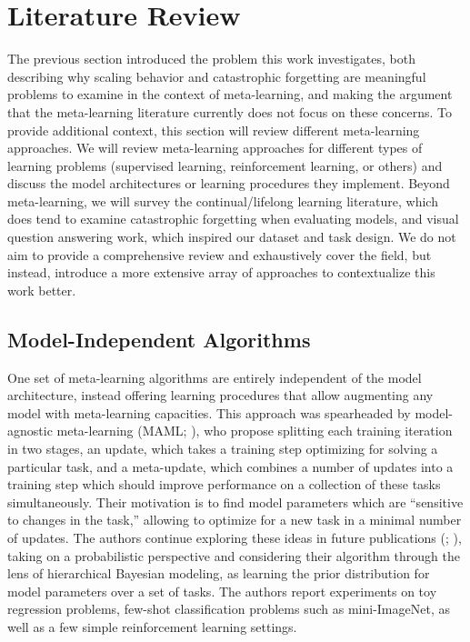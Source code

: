 \chapter{Literature Review\label{ch:literature-review}}
The previous section introduced the problem this work investigates, both describing why scaling behavior and catastrophic forgetting are meaningful problems to examine in the context of meta-learning, and making the argument that the meta-learning literature currently does not focus on these concerns. To provide additional context, this section will review different meta-learning approaches. We will review meta-learning approaches for different types of learning problems (supervised learning, reinforcement learning, or others) and discuss the model architectures or learning procedures they implement. Beyond meta-learning, we will survey the continual/lifelong learning literature, which does tend to examine catastrophic forgetting when evaluating models, and visual question answering work, which inspired our dataset and task design. We do not aim to provide a comprehensive review and exhaustively cover the field, but instead, introduce a more extensive array of approaches to contextualize this work better.

\section{Model-Independent Algorithms}
One set of meta-learning algorithms are entirely independent of the model architecture, instead offering learning procedures that allow augmenting any model with meta-learning capacities. This approach was spearheaded by model-agnostic meta-learning (MAML; \cite{Finn2017}), who propose splitting each training iteration in two stages, an update, which takes a training step optimizing for solving a particular task, and a meta-update, which combines a number of updates into a training step which should improve performance on a collection of these tasks simultaneously. Their motivation is to find model parameters which are ``sensitive to changes in the task,'' allowing to optimize for a new task in a minimal number of updates. The authors continue exploring these ideas in future publications (\cite{Finn2018a}; \cite{Grant2018}), taking on a probabilistic perspective and considering their algorithm through the lens of hierarchical Bayesian modeling, as learning the prior distribution for model parameters over a set of tasks. The authors report experiments on toy regression problems, few-shot classification problems such as mini-ImageNet, as well as a few simple reinforcement learning settings.
 
